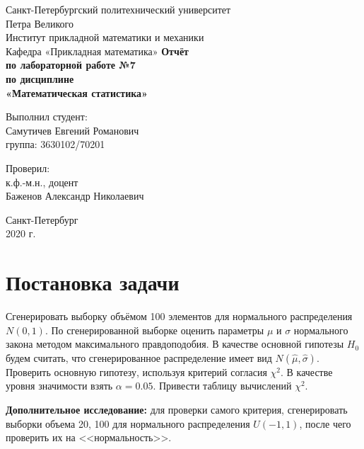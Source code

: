 \documentclass[12pt,a4paper]{article}
\begin{document}
	
\begin{titlepage}
	\begin{center}		
		\vfill	
		Санкт-Петербургский политехнический университет \\
		Петра Великого\\
		\vskip 1cm
		Институт прикладной математики и механики \\
		Кафедра «Прикладная математика»
		\vfill
		\textbf{Отчёт\\
			по лабораторной работе №7\\
			по дисциплине\\
			«Математическая статистика»\\}
		\vfill
	\end{center}
	\vfill
	\hfill
	\begin{minipage}{0.4\textwidth}
		Выполнил студент:\\
		Самутичев Евгений Романович\\
		группа: 3630102/70201\\
	\end{minipage}
	\vfill
	\hfill 
	\begin{minipage}{0.4\textwidth}
		Проверил:\\
		к.ф.-м.н., доцент\\
		Баженов Александр Николаевич\
	\end{minipage}
	\vfill
	\begin{center}
		Санкт-Петербург\\2020 г.
	\end{center}
\end{titlepage}

\tableofcontents
\listoffigures
\pagebreak

\section{Постановка задачи}
Сгенерировать выборку объёмом 100 элементов для нормального распределения $N(0, 1)$. По сгенерированной выборке оценить параметры $\mu$ и $\sigma$ нормального закона методом максимального правдоподобия. В качестве основной гипотезы $H_0$ будем считать, что сгенерированное распределение имеет вид $N(\widehat{\mu}, \widehat{\sigma})$. Проверить основную гипотезу, используя критерий согласия $\chi^2$. В качестве уровня значимости взять $\alpha = 0.05$. Привести таблицу вычислений $\chi^2$. 

\textbf{Дополнительное исследование:}\label{bonus} для проверки самого критерия, сгенерировать выборки объема 20, 100 для нормального распределения $U(-1, 1)$, после чего проверить их на <<нормальность>>.
\pagebreak
\end{document}
